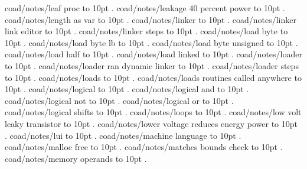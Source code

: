 \smallskip
coad/notes/leaf proc \leaders\hbox to 10pt {\hss.\hss}  \hfill {}
\smallskip
coad/notes/leakage 40 percent power \leaders\hbox to 10pt {\hss.\hss}  \hfill {}
\smallskip
coad/notes/length as var \leaders\hbox to 10pt {\hss.\hss}  \hfill {}
\smallskip
coad/notes/linker \leaders\hbox to 10pt {\hss.\hss}  \hfill {}
\smallskip
coad/notes/linker link editor \leaders\hbox to 10pt {\hss.\hss}  \hfill {}
\smallskip
coad/notes/linker steps \leaders\hbox to 10pt {\hss.\hss}  \hfill {}
\smallskip
coad/notes/load byte \leaders\hbox to 10pt {\hss.\hss}  \hfill {}
\smallskip
coad/notes/load byte lb \leaders\hbox to 10pt {\hss.\hss}  \hfill {}
\smallskip
coad/notes/load byte unsigned \leaders\hbox to 10pt {\hss.\hss}  \hfill {}
\smallskip
coad/notes/load half \leaders\hbox to 10pt {\hss.\hss}  \hfill {}
\smallskip
coad/notes/load linked \leaders\hbox to 10pt {\hss.\hss}  \hfill {}
\smallskip
coad/notes/loader \leaders\hbox to 10pt {\hss.\hss}  \hfill {}
\smallskip
coad/notes/loader ran dynamic linker \leaders\hbox to 10pt {\hss.\hss}  \hfill {}
\smallskip
coad/notes/loader steps \leaders\hbox to 10pt {\hss.\hss}  \hfill {}
\smallskip
coad/notes/loads \leaders\hbox to 10pt {\hss.\hss}  \hfill {}
\smallskip
coad/notes/loads routines called anywhere \leaders\hbox to 10pt {\hss.\hss}  \hfill {}
\smallskip
coad/notes/logical \leaders\hbox to 10pt {\hss.\hss}  \hfill {}
\smallskip
coad/notes/logical and \leaders\hbox to 10pt {\hss.\hss}  \hfill {}
\smallskip
coad/notes/logical not \leaders\hbox to 10pt {\hss.\hss}  \hfill {}
\smallskip
coad/notes/logical or \leaders\hbox to 10pt {\hss.\hss}  \hfill {}
\smallskip
coad/notes/logical shifts \leaders\hbox to 10pt {\hss.\hss}  \hfill {}
\smallskip
coad/notes/loops \leaders\hbox to 10pt {\hss.\hss}  \hfill {}
\smallskip
coad/notes/low volt leaky transistor \leaders\hbox to 10pt {\hss.\hss}  \hfill {}
\smallskip
coad/notes/lower voltage reduces energy power \leaders\hbox to 10pt {\hss.\hss}  \hfill {}
\smallskip
coad/notes/lui \leaders\hbox to 10pt {\hss.\hss}  \hfill {}
\smallskip
coad/notes/machine language \leaders\hbox to 10pt {\hss.\hss}  \hfill {}
\smallskip
coad/notes/malloc free \leaders\hbox to 10pt {\hss.\hss}  \hfill {}
\smallskip
coad/notes/matches bounds check \leaders\hbox to 10pt {\hss.\hss}  \hfill {}
\smallskip
coad/notes/memory operands \leaders\hbox to 10pt {\hss.\hss}  \hfill {}
